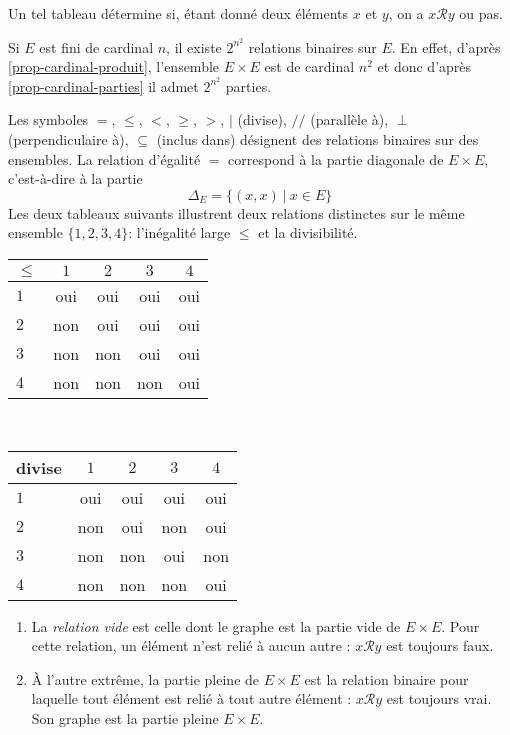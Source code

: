 Un tel tableau détermine si, étant donné deux éléments $x$ et $y$, on a $x\mathcal R y$ ou pas. 

\begin{exemple}
Si $E$ est fini de cardinal $n$, il existe $2^{n^2}$ relations binaires sur $E$. En effet, d'après \ref{prop-cardinal-produit}, l'ensemble $E\times E$ est de cardinal $n^2$ et donc d'après \ref{prop-cardinal-parties} il admet $2^{n^2}$ parties.
\end{exemple} 

\begin{exemples}
Les symboles $=$, $\leq$, $<$, $\geq$, $>$, $|$ (divise), $//$ (parallèle à), $\perp$ (perpendiculaire à), $\subseteq$ (inclus dans) désignent des relations binaires sur des ensembles. La relation d'égalité $=$ correspond à la partie diagonale de $E\times E$, c'est-à-dire à la partie 
\[ \Delta_E = \{(x,x)\:|\: x\in E\}\]
Les deux tableaux suivants illustrent deux relations distinctes sur le même ensemble $\{1,2,3,4\}$: l'inégalité large $\leq$ et la divisibilité.
\begin{center}
\begin{tabular}{|l|c|c|c|c|}\hline
$\leq$ & $1$ & $2$ & $3$ & $4$ \\ \hline
$1$ 	& oui & oui & oui & oui \\ \hline
$2$ 	& non & oui & oui & oui \\ \hline
$3$ & non & non & oui & oui \\ \hline
$4$	& non & non & non & oui \\ \hline
\end{tabular}
~~~
\begin{tabular}{|l|c|c|c|c|}\hline
divise & $1$ & $2$ & $3$ & $4$ \\ \hline
$1$ 	& oui & oui & oui & oui \\ \hline
$2$ 	& non & oui & non & oui \\ \hline
$3$ & non & non & oui & non \\ \hline
$4$	& non & non & non & oui \\ \hline
\end{tabular}
\end{center}

\end{exemples}


\begin{exemple}[Zérologie]
\begin{enumerate}
\item La \emph{relation vide} est celle dont le graphe est la partie vide de $E\times E$. Pour cette relation, un élément n'est relié à aucun autre : $x\mathcal R y$ est toujours faux.
\item À l'autre extrême, la partie pleine de $E\times E$ est la relation binaire pour laquelle tout élément est relié à tout autre élément : $x\mathcal R y$ est toujours vrai. Son graphe est la partie pleine $E\times E$.
\end{enumerate}
\end{exemple}

